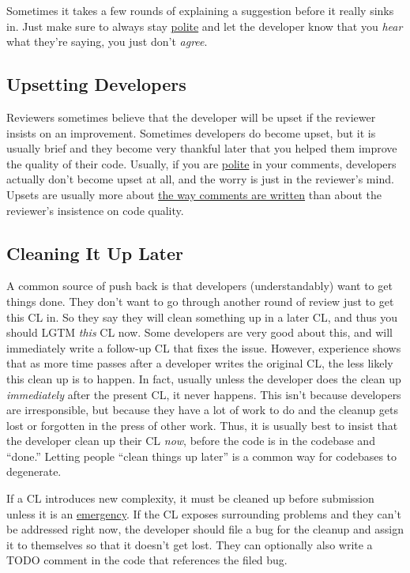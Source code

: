 \documentclass[
]{article}
\begin{document}
Sometimes it takes a few rounds of explaining a suggestion before it
really sinks in. Just make sure to always stay
\href{comments.md\#courtesy}{polite} and let the developer know that you
\emph{hear} what they're saying, you just don't \emph{agree}.

\subsection{Upsetting Developers}\label{upsetting_developers}

Reviewers sometimes believe that the developer will be upset if the
reviewer insists on an improvement. Sometimes developers do become
upset, but it is usually brief and they become very thankful later that
you helped them improve the quality of their code. Usually, if you are
\href{comments.md\#courtesy}{polite} in your comments, developers
actually don't become upset at all, and the worry is just in the
reviewer's mind. Upsets are usually more about
\href{comments.md\#courtesy}{the way comments are written} than about
the reviewer's insistence on code quality.

\subsection{Cleaning It Up Later}\label{later}

A common source of push back is that developers (understandably) want to
get things done. They don't want to go through another round of review
just to get this CL in. So they say they will clean something up in a
later CL, and thus you should LGTM \emph{this} CL now. Some developers
are very good about this, and will immediately write a follow-up CL that
fixes the issue. However, experience shows that as more time passes
after a developer writes the original CL, the less likely this clean up
is to happen. In fact, usually unless the developer does the clean up
\emph{immediately} after the present CL, it never happens. This isn't
because developers are irresponsible, but because they have a lot of
work to do and the cleanup gets lost or forgotten in the press of other
work. Thus, it is usually best to insist that the developer clean up
their CL \emph{now}, before the code is in the codebase and ``done.''
Letting people ``clean things up later'' is a common way for codebases
to degenerate.

If a CL introduces new complexity, it must be cleaned up before
submission unless it is an \href{../emergencies.md}{emergency}. If the
CL exposes surrounding problems and they can't be addressed right now,
the developer should file a bug for the cleanup and assign it to
themselves so that it doesn't get lost. They can optionally also write a
TODO comment in the code that references the filed bug.
\end{document}
